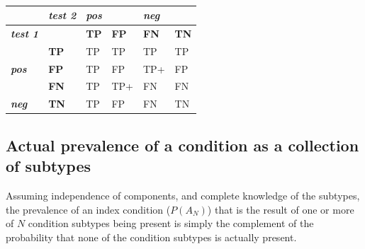 \documentclass[a4paper, 12pt, twoside]{article}
\let\Oldsubsection\subsection
\renewcommand{\subsection}{\FloatBarrier\Oldsubsection}
\begin{document}
\begin{table}[]
\centering
\caption{}
\label{tab:A1}
\begin{tabular}{@{}l|l|ll|ll|@{}}
\cmidrule(l){2-6}
\textbf{}                                                     & \textit{\textbf{test 2}} & \multicolumn{2}{l|}{\textit{\textbf{pos}}} & \multicolumn{2}{l|}{\textit{\textbf{neg}}}               \\ \midrule
\multicolumn{1}{|l|}{\textit{\textbf{test 1}}}                &                          & \textbf{TP}  & \textbf{FP}                 & \textbf{FN}                 & \textbf{TN}                \\ \midrule
\multicolumn{1}{|l|}{}                                        & \textbf{TP}              & TP           & TP                          & TP                          & TP                         \\
\multicolumn{1}{|l|}{\multirow{-2}{*}{\textit{\textbf{pos}}}} & \textbf{FP}              & TP           & FP                          & \cellcolor[HTML]{FFCCC9}TP+ & FP                         \\ \midrule
\multicolumn{1}{|l|}{}                                        & \textbf{FN}              & TP           & \cellcolor[HTML]{FFCCC9}TP+ & \cellcolor[HTML]{FFFFC7}FN  & \cellcolor[HTML]{FFFFC7}FN \\
\multicolumn{1}{|l|}{\multirow{-2}{*}{\textit{\textbf{neg}}}} & \textbf{TN}              & TP           & FP                          & \cellcolor[HTML]{FFFFC7}FN  & \cellcolor[HTML]{96FFFB}TN \\ \bottomrule
\end{tabular}
\end{table}

\subsection{Actual prevalence of a condition as a collection of subtypes}

Assuming independence of components, and complete knowledge of the subtypes, the prevalence of an index condition (\(P(A_N)\)) that is the result of one or more of \(N\) condition subtypes being present is simply the complement of the probability that none of the condition subtypes is actually present.
\end{document}
